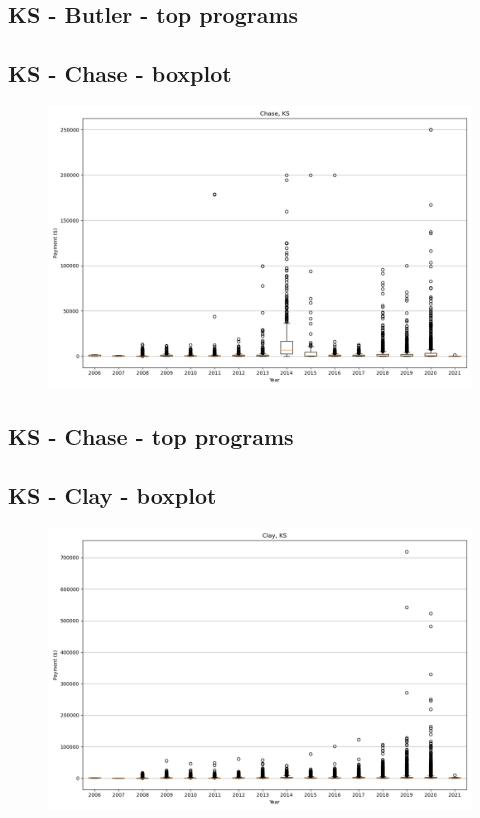 \subsection*{KS - Butler - top programs}

\newpage
\subsection*{KS - Chase - boxplot}
\begin{figure}[h]
\centering
\includegraphics[width=7in]{../output/boxplots/counties/Chase-KS_boxplot.png}
\end{figure}


\subsection*{KS - Chase - top programs}

\newpage
\subsection*{KS - Clay - boxplot}
\begin{figure}[h]
\centering
\includegraphics[width=7in]{../output/boxplots/counties/Clay-KS_boxplot.png}
\end{figure}


